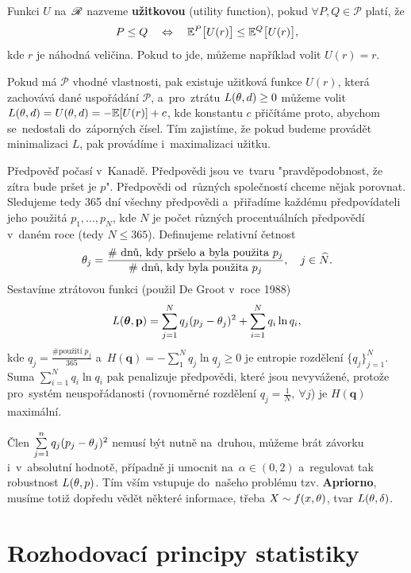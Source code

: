 \begin{define}
	Funkci $U$ na~$\mathscr{R}$ nazveme \textbf{užitkovou} (utility function), pokud $\forall P,Q\in\mathcal{P}$ platí, že 
	$$ P\leq Q\quad\Leftrightarrow\quad\mathbb{E}^P\big[U(r)\big]\leq\mathbb{E}^Q\big[U(r)\big],$$ kde $r$ je náhodná veličina. Pokud to jde, můžeme například volit $U(r)=r$.
\end{define}
\begin{remark}
	Pokud má $\mathcal{P}$ vhodné vlastnosti, pak existuje užitková funkce $U(r)$, která zachovává dané uspořádání $\mathcal{P}$, a~pro~ztrátu $L(\theta,d)\geq 0$ můžeme volit $L(\theta,d)=U(\theta,d)=-\mathbb{E}[U(r)]+c$, kde konstantu $c$ přičítáme proto, abychom se~nedostali do~záporných čísel. Tím zajistíme, že pokud budeme provádět minimalizaci $L$, pak provádíme i~maximalizaci užitku.
\end{remark}
\begin{example}[volba L]
	Předpověď počasí v~Kanadě. Předpovědi jsou ve~tvaru "pravděpodobnost, že zítra bude pršet je $p$". Předpovědi od~různých společností chceme nějak porovnat. Sledujeme tedy 365 dní všechny předpovědi a~přiřadíme každému předpovídateli jeho použitá $p_1,...,p_N$, kde $N$ je počet různých procentuálních předpovědí v~daném roce (tedy $N\leq 365$). Definujeme relativní četnost $$\theta_j=\frac{\text{\# dnů, kdy pršelo a~byla použita }p_j}{\text{\# dnů, kdy byla použita }p_j},\quad j\in\widehat{N}.$$ Sestavíme ztrátovou funkci (použil De Groot v~roce 1988) $$L(\boldsymbol{\theta},\textbf{p})=\sum_{j=1}^N q_j(p_j-\theta_j)^2+\sum_{i=1}^N q_i\ln q_i,$$ kde $q_j=\frac{\text{\# použití }p_j}{365}$ a~$H(\textbf{q})=-\sum_1^N q_j\ln q_j\geq 0$ je entropie rozdělení $\{q_j\}_{j=1}^N$. Suma $\sum_{i=1}^N q_i\ln q_i$ pak penalizuje předpovědi, které jsou nevyvážené, protože pro~systém neuspořádanosti (rovnoměrné rozdělení $q_j=\frac{1}{N},~\forall j$) je $H(\textbf{q})$ maximální.
	
	Člen $\sum\limits_{j=1}^{n} q_j(p_j-\theta_j)^2$ nemusí být nutně na~druhou, můžeme brát závorku i~v~absolutní hodnotě, případně ji umocnit na~$\alpha\in(0,2)$ a~regulovat tak robustnost $L(\theta,p)$. Tím vším vstupuje do~našeho problému tzv. \textbf{Apriorno}, musíme totiž dopředu vědět některé informace, třeba $X\sim f(x,\theta)$, tvar $L(\theta,\delta)$. 
\end{example}

\chapter{Rozhodovací principy statistiky}

